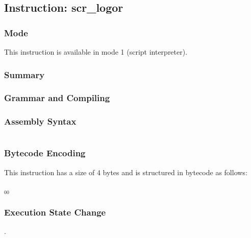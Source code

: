 \subsection{Instruction: scr\_logor}

\subsubsection{Mode}
This instruction is available in mode 1 (script interpreter).
\subsubsection{Summary}


\subsubsection{Grammar and Compiling}


\subsubsection{Assembly Syntax}

\begin{myquote}
\begin{verbatim}

\end{verbatim}
\end{myquote}

\subsubsection{Bytecode Encoding}

This instruction has a size of 4 bytes and is structured in bytecode as follows:

$_{00}$\ 

\subsubsection{Execution State Change}

.


